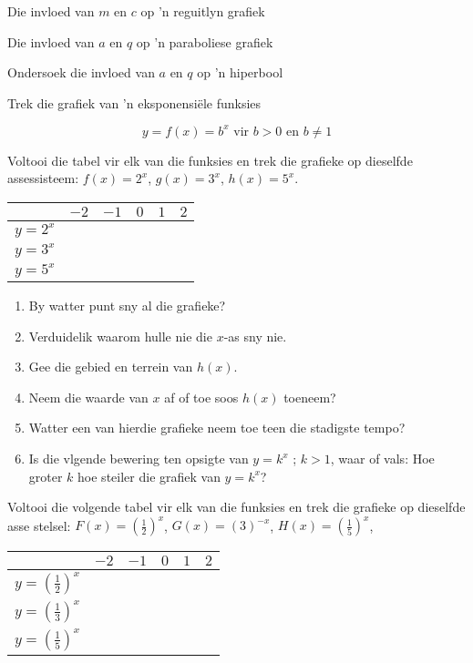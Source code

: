 \begin{Ondersoek}{Die invloed van $m$ en $c$ op 'n reguitlyn grafiek}
\begin{Ondersoek}{Die invloed van $a$ en $q$ op 'n paraboliese grafiek}
\begin{Ondersoek}{Ondersoek die invloed van $a$ en $q$ op 'n hiperbool}

\begin{wex}{Trek die grafiek van 'n eksponensiële funksies}
 {
\begin{equation*} y=f(x) =b^{x} \mbox{ vir } b>0 \mbox{ en } b \neq 1 \end{equation*}

Voltooi die tabel vir elk van die funksies en trek die grafieke op dieselfde assessisteem:
$f(x)=2^{x}$, $g(x)=3^{x}$, $h(x)=5^{x}$.


\begin{table}[H]
\begin{center}
\begin{tabular}{|c|c|c|c|c|c|}
\hline
   &  $-2$ & $-1$ & $0$ & $1$ & $2$ 
\\ \hline
 $y=2^{x}$&  &&&&
\\ \hline
 $y=3^{x}$&  &&&&
\\ \hline
 $y=5^{x}$&  &&&&
\\ \hline

\end{tabular}
\end{center}
\end{table}

\begin{enumerate}[noitemsep, label=\textbf{\arabic*}. ] 
 \item By watter punt sny al die grafieke?
\item Verduidelik waarom hulle nie die $x$-as sny nie.
\item Gee die gebied en terrein van $h(x)$.
 \item Neem die waarde van $x$ af of toe soos $h(x)$ toeneem?
\item Watter een van hierdie grafieke neem toe teen die stadigste tempo?
\item Is die vlgende bewering ten opsigte van $y=k^{x}$ ; $k>1$, waar of vals: Hoe groter $k$ hoe steiler die grafiek van $y=k^{x}$?
\end{enumerate}

Voltooi die volgende tabel vir elk van die funksies en trek die grafieke op dieselfde asse stelsel:
$F(x) =(\frac{1}{2})^{x}$, $G(x) =(3)^{-x}$, $H(x) =(\frac{1}{5})^{x}$, 
\begin{table}[H]
\begin{center}
\begin{tabular}{|c|c|c|c|c|c|}
\hline
   &  $-2$ & $-1$ & $0$ & $1$ & $2$ 
\\ \hline
 $y=(\frac{1}{2})^{x}$&  &&&&
\\ \hline
$y=(\frac{1}{3})^{x}$&  &&&&
\\ \hline
$y=(\frac{1}{5})^{x}$&  &&&&
\\ \hline


\end{tabular}
\end{center}
\end{table}}
\end{wex}
\end{Ondersoek}
\end{Ondersoek}
\end{Ondersoek}
